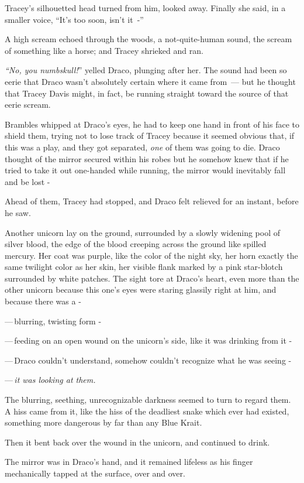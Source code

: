 Tracey's silhouetted head turned from him, looked away. Finally she said, in a smaller voice, ``It's too soon, isn't it~-''

A high scream echoed through the woods, a not-quite-human sound, the scream of something like a horse; and Tracey shrieked and ran.

\emph{``No, you numbskull!}'' yelled Draco, plunging after her. The sound had been so eerie that Draco wasn't absolutely certain where it came from~--- but he thought that Tracey Davis might, in fact, be running straight toward the source of that eerie scream.

Brambles whipped at Draco's eyes, he had to keep one hand in front of his face to shield them, trying not to lose track of Tracey because it seemed obvious that, if this was a play, and they got separated, \emph{one} of them was going to die. Draco thought of the mirror secured within his robes but he somehow knew that if he tried to take it out one-handed while running, the mirror would inevitably fall and be lost -

Ahead of them, Tracey had stopped, and Draco felt relieved for an instant, before he saw.

Another unicorn lay on the ground, surrounded by a slowly widening pool of silver blood, the edge of the blood creeping across the ground like spilled mercury. Her coat was purple, like the color of the night sky, her horn exactly the same twilight color as her skin, her visible flank marked by a pink star-blotch surrounded by white patches. The sight tore at Draco's heart, even more than the other unicorn because this one's eyes were staring glassily right at him, and because there was a -

---\,blurring, twisting form -

---\,feeding on an open wound on the unicorn's side, like it was drinking from it -

---\,Draco couldn't understand, somehow couldn't recognize what he was seeing -

---\,\emph{it was looking at them.}

The blurring, seething, unrecognizable darkness seemed to turn to regard them. A hiss came from it, like the hiss of the deadliest snake which ever had existed, something more dangerous by far than any Blue Krait.

Then it bent back over the wound in the unicorn, and continued to drink.

The mirror was in Draco's hand, and it remained lifeless as his finger mechanically tapped at the surface, over and over.

